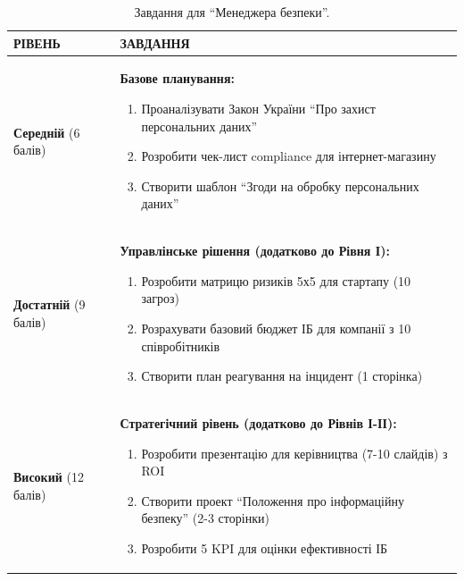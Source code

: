 \begin{table}[h!]
\caption{Завдання для ``Менеджера безпеки''.}
\label{tab:lab1_manag_task} %
\noindent %

\begin{tabular}{
  | >{\raggedright\arraybackslash}p{} 
  | >{\raggedright\arraybackslash}p{} |
}
\hline

\rowcolor{TableHeaderBrown}
\hfil \color{white}\textbf{РІВЕНЬ} & 
\hfil \color{white}\textbf{ЗАВДАННЯ} \\ \hline

\cellcolor{TableBodyPeach}
\textbf{Середній} (6 балів) &
\textbf{Базове планування:}
\begin{enumerate}
    \item Проаналізувати Закон України ``Про захист персональних даних''
    \item Розробити чек-лист compliance для інтернет-магазину
    \item Створити шаблон ``Згоди на обробку персональних даних''
\end{enumerate} \\ \hline

\cellcolor{TableBodyPeach}
\textbf{Достатній} (9 балів) &
\textbf{Управлінське рішення (додатково до Рівня І):}
\begin{enumerate}
    \item Розробити матрицю ризиків 5х5 для стартапу (10 загроз)
    \item Розрахувати базовий бюджет ІБ для компанії з 10 співробітників
    \item Створити план реагування на інцидент (1 сторінка)
\end{enumerate} \\ \hline

\cellcolor{TableBodyPeach}
\textbf{Високий} (12 балів) &
\textbf{Стратегічний рівень (додатково до Рівнів І-ІІ):}
\begin{enumerate}
    \item Розробити презентацію для керівництва (7-10 слайдів) з ROI
    \item Створити проект ``Положення про інформаційну безпеку'' (2-3 сторінки)
    \item Розробити 5 KPI для оцінки ефективності ІБ
\end{enumerate} \\ \hline

\end{tabular}
\end{table}

